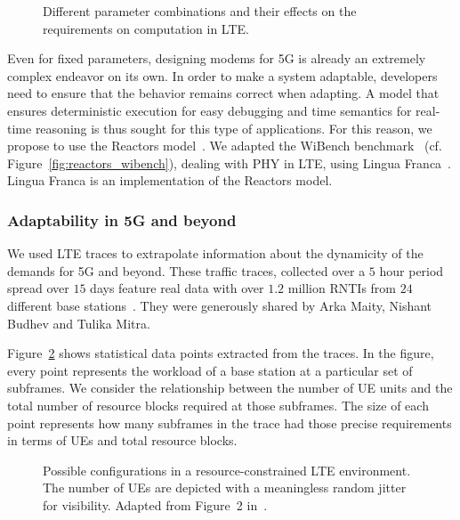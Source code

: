 \begin{figure}[t]
	\centering
	\caption{Different parameter combinations and their effects on the requirements on computation in \ac{LTE}.}
	\label{fig:5g_radar}
\end{figure}
        
Even for fixed parameters, designing modems for 5G is already an extremely complex endeavor on its own. 
In order to make a system adaptable, developers need to ensure that the behavior remains correct when adapting.
A model that ensures deterministic execution for easy debugging and time semantics for real-time reasoning is thus sought for this type of applications. 
For this reason, we propose to use the Reactors model~\cite{wittig_ict20}.
We adapted the WiBench benchmark~\cite{wibench} (cf. Figure~\ref{fig:reactors_wibench}), dealing with \acs{PHY} in \ac{LTE}, using Lingua Franca~\cite{lingua_franca}.
Lingua Franca is an implementation of the Reactors model.

\subsubsection{Adaptability in 5G and beyond}

We used LTE traces to extrapolate information about the dynamicity of the demands for 5G and beyond.
These traffic traces, collected over a $5$ hour period spread over $15$ days feature real data with over $1.2$ million \acp{RNTI} from $24$ different base stations~\cite{budhdev2020isoran}.
They were generously shared by Arka Maity, Nishant Budhev and Tulika Mitra.

Figure~\ref{fig:statistics} shows statistical data points extracted from the traces.
In the figure, every point represents the workload of a base station at a particular set of subframes.
We consider the relationship between the number of \ac{UE} units and the total number of resource blocks required at those subframes.
The size of each point represents how many subframes in the trace had those precise requirements in terms of \acp{UE} and total resource blocks.

\begin{figure}[t]
	\centering
	\caption{Possible configurations in a resource-constrained \acs{LTE} environment. The number of UEs are depicted with a meaningless random jitter for visibility. Adapted from Figure~2 in~\cite{wittig_ict20}.}
	\label{fig:statistics}
\end{figure}


